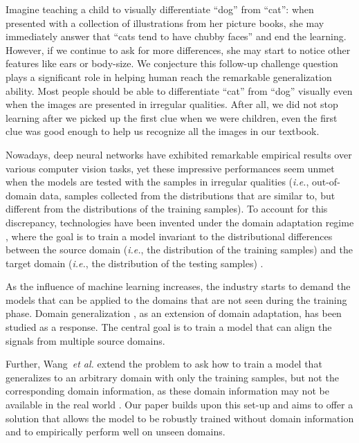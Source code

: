 \documentclass[runningheads]{llncs}
\begin{document}
Imagine teaching a child to visually differentiate ``dog'' from ``cat'': 
when presented with a collection of illustrations from her picture books, 
she may immediately answer that ``cats tend to have chubby faces'' and end the learning. 
However, if we continue to ask for more differences, she may start to notice other features like ears or body-size.  
We conjecture this follow-up challenge question plays a significant role in helping human reach the remarkable generalization ability. 
Most people should be able to differentiate ``cat'' from ``dog'' visually even when the images are presented in irregular qualities. 
After all, we did not stop learning after we picked up the first clue when we were children, 
even the first clue was good enough to help us recognize all the images in our textbook. 

Nowadays, deep neural networks have exhibited remarkable empirical results
over various computer vision tasks, 
yet these impressive performances seem unmet when the models are tested with the 
samples in irregular qualities  
(\textit{i.e.}, out-of-domain data, samples collected from the distributions that are similar to, but different from the distributions of the training samples). 
To account for this discrepancy, technologies have been invented under the domain adaptation regime \cite{ben2010theory,bridle1991recnorm}, 
where the goal is to train a model invariant to the distributional differences between the source domain (\textit{i.e.}, the distribution of the training samples) and the target domain (\textit{i.e.}, the distribution of the testing samples) \cite{csurka2017domain,wang2018deep}. 

As the influence of machine learning increases, 
the industry starts to demand the models that can be applied to the domains that are not seen during the training phase. 
Domain generalization \cite{muandet2013domain}, as an extension of domain adaptation, has been studied as a response. 
The central goal is to train a model that can align the signals from multiple source domains.

Further, Wang~\textit{et al.} extend the problem to ask how to train a model that generalizes to an arbitrary domain with only the training samples, but not the corresponding domain information, as these domain information may not be available in the real world \cite{wang2018learning}. 
Our paper builds upon this set-up and aims to offer a solution that allows the model to be robustly trained without domain information and to empirically perform well on unseen domains. 
\end{document}
